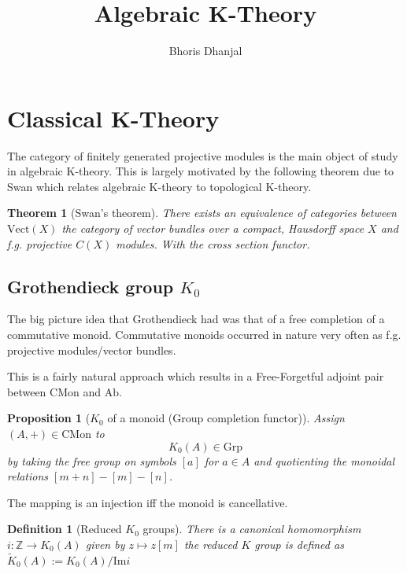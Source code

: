 \documentclass[12pt]{article}
\title{Algebraic K-Theory}
\author{Bhoris Dhanjal}
\numberwithin{equation}{section}
\newcommand{\Z}{\mathbb{Z}}
\newcommand{\image}{{\mathrm{Im}}}
\newcounter{dummy} \numberwithin{dummy}{section}
\newtheorem{theorem}[dummy]{Theorem}
\newtheorem{definition}[dummy]{Definition}
\newtheorem{proposition}[dummy]{Proposition}
\begin{document}
	\tableofcontents
	\maketitle
	\section{Classical K-Theory}
	The category of finitely generated projective modules is the main object of study in algebraic K-theory. This is largely motivated by the following theorem due to Swan \cite{Swan1962} which relates algebraic K-theory to topological K-theory.
	\begin{theorem}[Swan's theorem]
		There exists an equivalence of categories between $\mathrm{Vect}(X)$ the category of vector bundles over a compact, Hausdorff space $X$ and f.g. projective $C(X)$ modules. With the cross section functor.
	\end{theorem}
	
	\subsection{Grothendieck group $K_0$}
	The big picture idea that Grothendieck had was that of a free completion of a commutative monoid. Commutative monoids occurred in nature very often as f.g. projective modules/vector bundles. 
	
	This is a fairly natural approach which results in a Free-Forgetful adjoint pair between $\mathrm{CMon}$ and $\mathrm{Ab}$. 
		
	\begin{proposition}[$K_0$ of a monoid (Group completion functor)]
		Assign $(A,+) \in \mathrm{CMon} $ to \[K_0(A) \in \mathrm{Grp}\] by taking the free group on symbols $[a]$ for $a \in A$ and quotienting the monoidal relations $[m+n]-[m]-[n]$.
	\end{proposition}
	
	The mapping is an injection iff the monoid is cancellative.
	\begin{definition}[Reduced $K_0$ groups]
	There is a canonical homomorphism $i: \Z \to K_0(A)$ given by $z \mapsto z[m]$ the reduced $K$ group is defined as $\tilde{K}_0(A):=K_0(A)/\image i $
	\end{definition}
	
\end{document}
